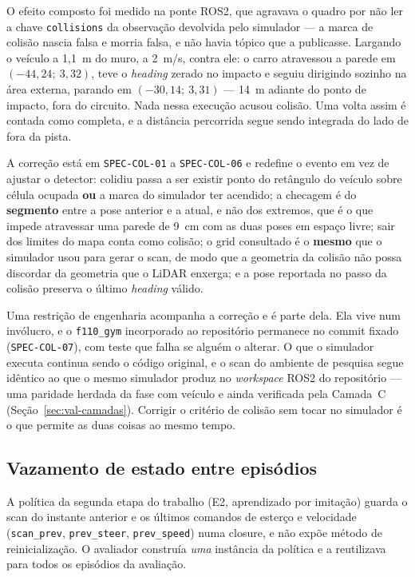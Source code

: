 O efeito composto foi medido na ponte ROS2, que agravava o quadro por não ler a
chave \texttt{collisions} da observação devolvida pelo simulador --- a marca de
colisão nascia falsa e morria falsa, e não havia tópico que a publicasse. Largando o
veículo a 1,1~m do muro, a 2~m/s, contra ele: o carro atravessou a parede em
$(-44{,}24;\ 3{,}32)$, teve o \textit{heading} zerado no impacto e seguiu dirigindo
sozinho na área externa, parando em
$(-30{,}14;\ 3{,}31)$ --- 14~m adiante do ponto de impacto, fora do circuito. Nada
nessa execução acusou colisão. Uma volta assim é contada como completa, e a
distância percorrida segue sendo integrada do lado de fora da pista.

A correção está em \texttt{SPEC-COL-01} a \texttt{SPEC-COL-06} e redefine o evento
em vez de ajustar o detector: colidiu passa a ser existir ponto do retângulo do
veículo sobre célula ocupada \textbf{ou} a marca do simulador ter acendido; a
checagem é do \textbf{segmento} entre a pose anterior e a atual, e não dos extremos,
que é o que impede atravessar uma parede de 9~cm com as duas poses em espaço livre;
sair dos limites do mapa conta como colisão; o grid consultado é o \textbf{mesmo}
que o simulador usou para gerar o scan, de modo que a geometria da colisão não possa
discordar da geometria que o LiDAR enxerga; e a pose reportada no passo da colisão
preserva o último \textit{heading} válido.

Uma restrição de engenharia acompanha a correção e é parte dela. Ela vive num
invólucro, e o \texttt{f110\_gym} incorporado ao repositório permanece no commit
fixado (\texttt{SPEC-COL-07}), com teste que falha se alguém o alterar. O que o
simulador executa continua sendo o código original, e o scan do ambiente de
pesquisa segue idêntico ao que o mesmo simulador produz no \textit{workspace} ROS2
do repositório --- uma paridade herdada da fase com veículo e ainda verificada
pela Camada~C (Seção~\ref{sec:val-camadas}). Corrigir o critério de colisão sem tocar no simulador é o que
permite as duas coisas ao mesmo tempo.

\subsection{Vazamento de estado entre episódios}

A política da segunda etapa do trabalho (E2, aprendizado por imitação) guarda o
scan do instante anterior e os últimos comandos de esterço e velocidade
(\texttt{scan\_prev}, \texttt{prev\_steer}, \texttt{prev\_speed}) numa closure, e
não expõe método de reinicialização. O avaliador construía \textit{uma} instância
da política e a reutilizava para todos os episódios da avaliação.

